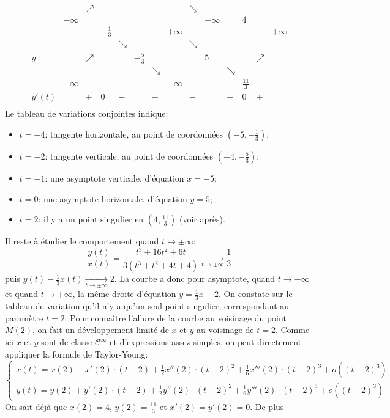 {\begin{enumerate}
{$$\begin{array}{c|lcccccccccccr}
\ &  &\nearrow &&&&&&\searrow&&&&&\\
\ &-\infty &\ & &&&&&&-\infty&&4&&\\\hline
\ & &\ & -\frac{1}{3}&&&&+\infty&&&&&&+\infty\\
\ & &\ & &\searrow&&&&\searrow&&&&&\\
y&\ &\nearrow & &&-\frac{5}{3}&&&&5&&&\nearrow&\\
\ & &\ & &&&\searrow&&&&\searrow&&&\\
\ &-\infty & & &&&&-\infty&&&&\frac{11}{3}&&\\\hline
y'(t)&& + &0 &-&&-&&-&&-&0&+&\\
\end{array}$$
Le tableau de variations conjointes indique:
\begin{itemize}
\item $t=-4$: tangente horizontale, au point de coordonnées $(-5,-\frac{1}{3})$;
\item $t=-2$: tangente verticale, au point de coordonnées $(-4,-\frac{5}{3})$;
\item $t=-1$: une asymptote verticale, d'équation $x=-5$;
\item $t=0$: une asymptote horizontale, d'équation $y=5$;
\item $t=2$: il y a un point singulier en $(4,\frac{11}{3})$ (voir après).
\end{itemize}
Il reste à étudier le comportement quand $t\to\pm\infty$:
$$\frac{y(t)}{x(t)}=\frac{t^3+16t^2+6t}{3(t^3+t^2+4t+4)}\xrightarrow[t\to\pm\infty]{}\frac{1}{3}$$
puis $y(t)-\frac{1}{3}x(t)\xrightarrow[t\to\pm\infty]{}2$. La courbe a donc pour asymptote, quand $t\to-\infty$ et quand $t\to+\infty$, la m\^eme droite d'équation $y=\frac{1}{3}x+2$.
On constate sur le tableau de variation qu'il n'y a qu'un seul point singulier, correspondant au paramètre $t=2$. Pour conna\^itre l'allure de la courbe au voisinage du point $M(2)$, on fait un développement limité de $x$ et $y$ au voisinage de $t=2$. Comme ici $x$ et $y$ sont de classe $\mathcal{C}^\infty$ et d'expressions assez simples, on peut directement appliquer la formule de Taylor-Young:
$$\left\{\begin{array}{l}
x(t)=x(2)+x'(2)\cdot(t-2)+\frac{1}{2}x''(2)\cdot(t-2)^2+\frac{1}{6}x'''(2)\cdot(t-2)^3+o((t-2)^3)\\
y(t)=y(2)+y'(2)\cdot(t-2)+\frac{1}{2}y''(2)\cdot(t-2)^2+\frac{1}{6}y'''(2)\cdot(t-2)^3+o((t-2)^3)
\end{array}\right.$$ 
On sait déjà que $x(2)=4$, $y(2)=\frac{11}{3}$ et $x'(2)=y'(2)=0$. De plus
}
\end{enumerate}}

